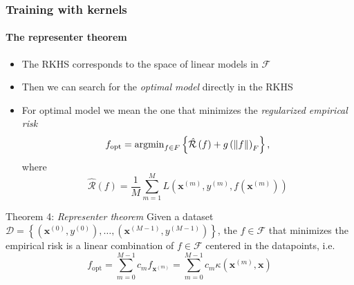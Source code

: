 \documentclass[aspectratio=43]{beamer}
\newcommand{\kernel}[2]{\kappa\left( #1, #2 \right)}
\begin{document}
\begin{frame}
  \frametitle{Training with kernels}
  \framesubtitle{The representer theorem}

  \small
  \begin{itemize}
    \item<1-> The RKHS corresponds to the space of linear models in $\mathcal{F}$
    \item<2-> Then we can search for the \emph{optimal model} directly in the RKHS
    \item<3-> For optimal model we mean the one that minimizes the \emph{regularized empirical risk}
    \[f_{\mathrm{opt}} = \mathrm{argmin}_{f\in F}\left\{ \hat{\mathcal{R}}\left( f \right) + g\left( \norm{f} \right)_F \right\},\]
    where
    \[\hat{\mathcal{R}}\left( f \right) = \frac{1}{M}\sum_{m=1}^M L\left( \mathbf{x}^{(m)}, y^{(m)}, f(\mathbf{x}^{(m)}) \right)\]
  \end{itemize}

  \pause
  \begin{block}{Theorem 4: \emph{Representer theorem}}
    Given a dataset $\mathcal{D}=\left\{ \left( \mathbf{x}^{(0)}, y^{(0)} \right), \dots, \left( \mathbf{x}^{(M-1)}, y^{(M-1)} \right) \right\}$, the $f\in \mathcal{F}$ that minimizes the empirical risk is a linear combination of $f\in \mathcal{F}$ centered in the datapoints, i.e.
    \[f_{\mathrm{opt}}=\sum_{m=0}^{M-1} c_m f_{\mathbf{x}^{(m)}} = \sum_{m=0}^{M-1} c_m \kernel{\mathbf{x}^{(m)}}{\mathbf{x}}\]
  \end{block}
  

\end{frame}
\end{document}
